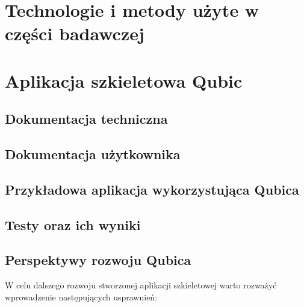 \documentclass[12pt]{report}
\begin{document}
\chapter{Technologie i metody użyte w części badawczej} \label{technologie}

\chapter{Aplikacja szkieletowa Qubic} \label{qubic}

\section{Dokumentacja techniczna}

\section{Dokumentacja użytkownika}

\section{Przykładowa aplikacja wykorzystująca Qubica}

\section{Testy oraz ich wyniki}

\section{Perspektywy rozwoju Qubica}

W celu dalszego rozwoju stworzonej aplikacji szkieletowej warto rozważyć wprowadzenie następujących usprawnień:
\end{document}
